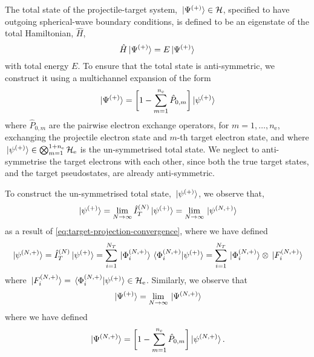 \documentclass[draft]{article}
\begin{document}
The total state of the projectile-target system,
$\ket*{\Psi^{(+)}} \in \mathcal{H}$, specified to have outgoing
spherical-wave boundary conditions, is defined to be an eigenstate of the total
Hamiltonian, $\hat{H}$,
\begin{equation}
  \label{eq:total-state}
  \hat{H}
  \ket*{\Psi^{\lr{+}}}
  =
  E
  \ket*{\Psi^{\lr{+}}}
\end{equation}
with total energy $E$.
To ensure that the total state is anti-symmetric, we construct it using a
multichannel expansion of the form
\begin{equation}
  \label{eq:total-state-multichannel}
  \ket*{\Psi^{\lr{+}}}
  =
  \lrsq[\bigg]
  {
    1
    -
    \sum_{m = 1}^{n_{\mathrm{e}}}
    \hat{P}_{0, m}
  }
  \ket*{\psi^{\lr{+}}}
\end{equation}
where $\hat{P}_{0, m}$ are the pairwise electron exchange operators, for
$m = 1, \dotsc, n_{\mathrm{e}}$, exchanging the projectile electron state and
$m$-th target electron state, and where
$\ket*{\psi^{(+)}} \in
\bigotimes_{m = 1}^{1 + n_{\mathrm{e}}} \mathcal{H}_{\mathrm{e}}$ is the
un-symmetrised total state.
We neglect to anti-symmetrise the target electrons with each other, since both
the true target states, and the target pseudostates, are already anti-symmetric.

To construct the un-symmetrised total state, $\ket*{\psi^{(+)}}$, we
observe that,
\begin{equation}
  \label{eq:total-state-un-symmetrised-convergence}
  \ket*{\psi^{\lr{+}}}
  =
  \lim_{N \to \infty}
  \hat{I}_{T}^{\lr{N}}
  \ket*{\psi^{\lr{+}}}
  =
  \lim_{N \to \infty}
  \ket*{\psi^{\lr{N, +}}}
\end{equation}
as a result of \autoref{eq:target-projection-convergence},
where we have defined
\begin{equation}
  \label{eq:total-state-un-symmetrised-n}
  \ket*{\psi^{\lr{N, +}}}
  =
  \hat{I}_{T}^{\lr{N}}
  \ket*{\psi^{\lr{+}}}
  =
  \sum_{i = 1}^{N_{T}}
  \ket*{\Phi_{i}^{\lr{N, +}}}
  \bra*{\Phi_{i}^{\lr{N, +}}}
  \ket*{\psi^{\lr{+}}}
  =
  \sum_{i = 1}^{N_{T}}
  \ket*{\Phi_{i}^{\lr{N, +}}}
  \otimes
  \ket*{F_{i}^{\lr{N, +}}}
\end{equation}
where $\ket*{F_{i}^{(N, +)}}
= \bra*{\Phi_{i}^{(N, +)}}\ket*{\psi^{(+)}}
\in \mathcal{H}_{\mathrm{e}}$.
Similarly, we observe that
\begin{equation}
  \label{eq:total-state-multichannel-convergence}
  \ket*{\Psi^{\lr{+}}}
  =
  \lim_{N \to \infty}
  \ket*{\Psi^{\lr{N, +}}}
\end{equation}
where we have defined
\begin{equation}
  \label{eq:total-state-multichannel-n}
  \ket*{\Psi^{\lr{N, +}}}
  =
  \lrsq[\bigg]
  {
    1
    -
    \sum_{m = 1}^{n_{\mathrm{e}}}
    \hat{P}_{0, m}
  }
  \ket*{\psi^{\lr{N, +}}}
  .
\end{equation}
\end{document}
